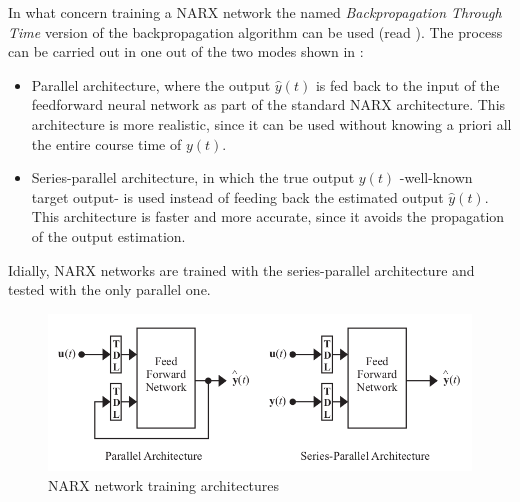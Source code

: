 
In what concern training a NARX network the named \emph{Backpropagation Through Time} version of the backpropagation algorithm can be used (read ). The process can be carried out in one out of the two modes shown in  \cite{menezes2008long}: 
\begin{itemize}
	\item Parallel architecture, 
	where the output $\hat{y}(t)$ is fed back to the input of the feedforward neural network as part of the standard NARX architecture. This architecture is more realistic, since it can be used without knowing a priori all the entire course time of $y(t)$. 
	\item Series-parallel architecture,  
	in which the true output $y(t)$ -well-known target output- is used instead of feeding back the estimated output $\hat{y}(t)$. This architecture is faster and more accurate, since it avoids the propagation of the output estimation.
\end{itemize}

Idially, NARX networks are trained with the series-parallel architecture and tested with the only parallel one.

\begin{figure}[!ht]
\centering
\includegraphics[width=\textwidth]{images/narxTrainingArchitectures.png}
\caption{NARX network training architectures}
\label{fig:narxtrainingarch}
\end{figure}



